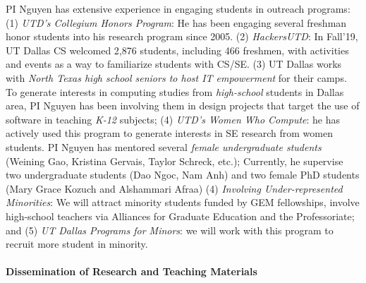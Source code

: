 PI Nguyen has extensive experience in engaging students in
outreach programs: (1) {\em UTD's Collegium Honors Program}: He
has been engaging several freshman honor students into his research
program since 2005. (2) {\em HackersUTD}: In Fall'19, UT Dallas CS
welcomed 2,876 students, including 466 freshmen, with activities and
events as a way to familiarize students with CS/SE.
%
(3) UT Dallas works with {\em North Texas high school seniors to host
IT empowerment} for their camps. To generate interests in computing
studies from {\em high-school} students in Dallas area, PI Nguyen has
been involving them in design projects that target the use of software
in teaching {\em K-12} subjects; (4) {\em UTD's Women Who Compute}: he
has actively used this program to generate interests in SE research
from women students. PI Nguyen has mentored several {\em female
undergraduate students} (Weining Gao, Kristina Gervais, Taylor
Schreck, etc.); Currently, he supervise two undergraduate students
(Dao Ngoc, Nam Anh) and two female PhD students (Mary Grace Kozuch and
Alshammari Afraa) (4) {\em Involving Under-represented Minorities}: We
will attract minority students funded by GEM fellowships, involve
high-school teachers via Alliances for Graduate Education and the
Professoriate; and (5) {\em UT Dallas Programs for Minors}: we will
work with this program to recruit more student in minority.


\paragraph{Dissemination of Research and Teaching Materials}

